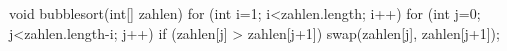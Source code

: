 void bubblesort(int[] zahlen) {
   for (int i=1; i<zahlen.length; i++) {
      for (int j=0; j<zahlen.length-i; j++) {
         if (zahlen[j] > zahlen[j+1]) {
            swap(zahlen[j], zahlen[j+1]);				
         }
      }
   }
}